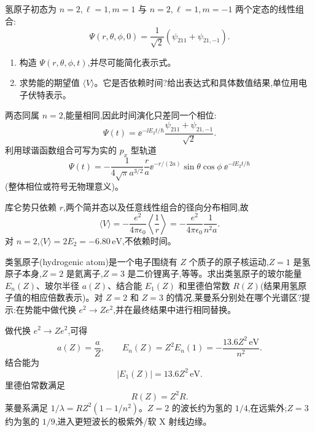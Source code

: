 \begin{question}
氢原子初态为 $n=2,\ell=1,m=1$ 与 $n=2,\ell=1,m=-1$ 两个定态的线性组合:
\[
\Psi(r,\theta,\phi,0)=\frac{1}{\sqrt2}\left(\psi_{211}+\psi_{21,-1}\right).
\]
\begin{enumerate}
\item 构造 $\Psi(r,\theta,\phi,t)$,并尽可能简化表示式。
\item 求势能的期望值 $\langle V\rangle$。它是否依赖时间?给出表达式和具体数值结果,单位用电子伏特表示。
\end{enumerate}
\end{question}
\begin{solution}

两态同属 $n=2$,能量相同,因此时间演化只差同一个相位:
\[
\Psi(t)=\ee^{-\ii E_2t/\hbar}\frac{\psi_{211}+\psi_{21,-1}}{\sqrt2}.
\]
利用球谐函数组合可写为实的 $p_x$ 型轨道
\[
\Psi(t)=-\frac{1}{4\sqrt{\pi}a^{3/2}}\frac{r}{a}\ee^{-r/(2a)}\sin\theta\cos\phi\ \ee^{-\ii E_2t/\hbar}
\]
(整体相位或符号无物理意义)。

库仑势只依赖 $r$,两个简并态以及任意线性组合的径向分布相同,故
\[
\langle V\rangle=-\frac{e^2}{4\pi\epsilon_0}\left\langle\frac1r\right\rangle
=-\frac{e^2}{4\pi\epsilon_0}\frac{1}{n^2a}.
\]
对 $n=2$,$\langle V\rangle=2E_2=-6.80\,\mathrm{eV}$,不依赖时间。

\end{solution}

\begin{question}
类氢原子(hydrogenic atom)是一个电子围绕有 $Z$ 个质子的原子核运动,$Z=1$ 是氢原子本身,$Z=2$ 是氦离子,$Z=3$ 是二价锂离子,等等。求出类氢原子的玻尔能量 $E_n(Z)$、玻尔半径 $a(Z)$、结合能 $E_1(Z)$ 和里德伯常数 $R(Z)$(结果用氢原子值的相应倍数表示)。对 $Z=2$ 和 $Z=3$ 的情况,莱曼系分别处在哪个光谱区?提示:在势能中做代换 $e^2\to Ze^2$,并在最终结果中进行相同替换。
\end{question}
\begin{solution}

做代换 $e^2\to Ze^2$,可得
\[
a(Z)=\frac{a}{Z},\qquad E_n(Z)=Z^2E_n(1)=-\frac{13.6Z^2\,\mathrm{eV}}{n^2}.
\]
结合能为
\[
|E_1(Z)|=13.6Z^2\,\mathrm{eV}.
\]
里德伯常数满足
\[
R(Z)=Z^2R.
\]
莱曼系满足 $1/\lambda=RZ^2(1-1/n^2)$。$Z=2$ 的波长约为氢的 $1/4$,在远紫外;$Z=3$ 约为氢的 $1/9$,进入更短波长的极紫外/软 X 射线边缘。

\end{solution}

